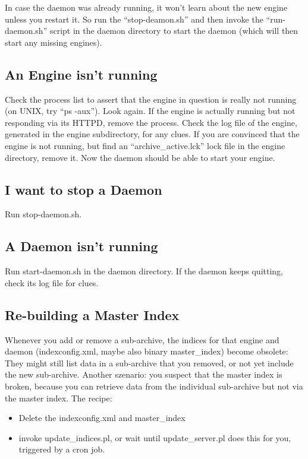 In case the daemon was already running, it won't learn about the new
engine unless you restart it. So run the ``stop-deamon.sh'' and then
invoke the ``run-daemon.sh'' script in the daemon directory to start
the daemon (which will then start any missing engines).

\subsection{An Engine isn't running}
Check the process list to assert that the engine in question is really not
running (on UNIX, try ``ps -aux''). Look again. If the engine is
actually running but not responding via its HTTPD, remove the process.
Check the log file of the engine, generated in the engine
subdirectory, for any clues. If you are convinced that the engine is
not running, but find an ``archive\_active.lck'' lock file in the
engine directory, remove it. Now the daemon should be able to start
your engine.  

\subsection{I want to stop a Daemon}
Run stop-daemon.sh.

\subsection{A Daemon isn't running}
Run start-daemon.sh in the daemon directory. If the daemon keeps quitting,
check its log file for clues.

\subsection{Re-building a Master Index}
Whenever you add or remove a sub-archive, the indices for that engine
and daemon (indexconfig.xml, maybe also binary master\_index)
become obsolete: They might still list data in a
sub-archive that you removed, or not yet include the new
sub-archive. Another szenario: you suspect that the master index is
broken, because you can retrieve data from the individual sub-archive
but not via the master index. The recipe:
\begin{itemize}
\item Delete the indexconfig.xml and master\_index
\item invoke update\_indices.pl, or wait until update\_server.pl
      does this for you, triggered by a cron job.
\end{itemize}

